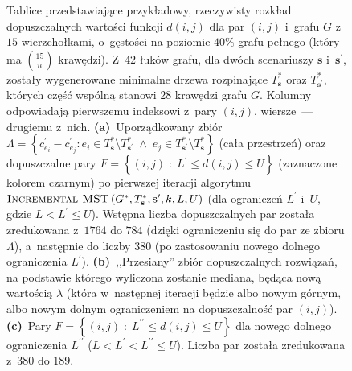 \begin{figure}[!h]
\begin{subfigure}[b]{0.3\textwidth}
{\begin{tabu}{|c|c|c|c|c|c|c|c|c|c|c|c|c|c|c|c|c|c|c|c|c|c|c|c|c|c|c|c|}
			\end{tabu}%
		}
		\caption{}
		\label{fig:imstSeed:c}
	\end{subfigure}
	\hfill\null
	\caption{
		Tablice przedstawiające przykładowy, rzeczywisty rozkład dopuszczalnych wartości funkcji $d \left( i, j \right)$ dla par $\left( i, j \right)$ i~grafu $G$ z~$15$ wierzchołkami, o~gęstości na poziomie $40\%$ grafu pełnego (który ma $\binom{15}{n}$ krawędzi). 
		Z~$42$ łuków grafu, dla dwóch scenariuszy $\textbf{s}$ i~$\textbf{s}^{\prime}$, zostały wygenerowane minimalne drzewa rozpinające $T^{\ast}_{\textbf{s}}$ oraz $T^{\ast}_{\textbf{s}^{\prime}}$, których część wspólną stanowi $28$ krawędzi grafu $G$.
		Kolumny odpowiadają pierwszemu indeksowi z~pary $\left( i, j \right)$, wiersze~--- drugiemu z~nich.
		\textbf{(a)}~Uporządkowany zbiór $\Lambda = \left\{ c^{\prime}_{e_{i}} - c^{\prime}_{e_{j}} : e_{i} \in T^{\ast}_{\textbf{s}} \setminus T^{\ast}_{\textbf{s}^{\prime}} \; \wedge \; e_{j} \in T^{\ast}_{\textbf{s}^{\prime}} \setminus T^{\ast}_{\textbf{s}} \right\}$ (cała przestrzeń) oraz dopuszczalne pary $F = \left\{ \left( i, j \right) \; : \; L^{\prime} \leqslant d \left( i, j \right) \leqslant U \right\}$ (zaznaczone kolorem czarnym) po pierwszej iteracji algorytmu $\textsc{Incremental-MST} \left( G^{\ast}, T^{\ast}_{\textbf{s}}, \textbf{s}^{\prime}, k, L, U \right)$ (dla ograniczeń $L^{\prime}$ i~$U$, gdzie $L < L^{\prime} \leqslant U$).
		Wstępna liczba dopuszczalnych par została zredukowana z~$1764$ do $784$ (dzięki ograniczeniu się do par ze zbioru $\Lambda$), a~następnie do liczby $380$ (po zastosowaniu nowego dolnego ograniczenia $L^{\prime}$).
		\textbf{(b)}~,,Przesiany'' zbiór dopuszczalnych rozwiązań, na podstawie którego wyliczona zostanie mediana, będąca nową wartością $\lambda$ (która w~następnej iteracji będzie albo nowym górnym, albo nowym dolnym ograniczeniem na dopuszczalność par $\left( i, j \right)$).
		\textbf{(c)}~Pary $F = \left\{ \left( i, j \right) \; : \; L^{\prime\prime} \leqslant d \left( i, j \right) \leqslant U \right\}$ dla nowego dolnego ograniczenia $L^{\prime\prime}$ ($L < L^{\prime} < L^{\prime\prime} \leqslant U$).
		Liczba par została zredukowana z~$380$ do $189$.
	}
	\label{fig:imstSeed}
\end{figure}

